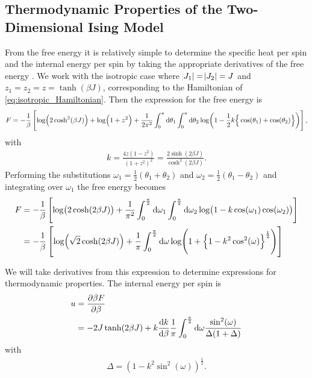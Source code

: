 \documentclass[11pt, a4paper]{report} %
\begin{document}
\subsection{Thermodynamic Properties of the Two-Dimensional Ising Model}
From the free energy it is relatively simple to determine the specific heat per spin and the internal energy per spin by taking the appropriate derivatives of the free energy \cite{mccoy:1973}. We work with the isotropic case where \(\abs{J_1} = \abs{J_2} = J\) and \(z_1 = z_2 = z = \tanh(\beta J)\), corresponding to the Hamiltonian of \cref{eq:isotropic_Hamiltonian}.
Then the expression for the free energy is
\begin{dmath}
	F = -\frac{1}{\beta} \left[\log(2\cosh^2(\beta J)) + \log(1+z^2) + \frac{1}{2\pi^2} \int_0^{\pi}\dif \theta_1 \int_0^{\pi} \dif \theta_2 \log(1-\frac{1}{2}k \Big\{\cos(\theta_1) + \cos(\theta_2)\Big\})\right],
\end{dmath}
with
\begin{align}
	\label{eq:elliptic_argument}
	k = \frac{4z(1-z^2)}{(1+z^2)^2} = \frac{2\sinh(2\beta J)}{\cosh^2{(2\beta J)}}.
\end{align}
Performing the substitutions \(\omega_1 = \frac{1}{2}(\theta_1 + \theta_2)\) and \(\omega_2 = \frac{1}{2}(\theta_1 - \theta_2)\) and integrating over \(\omega_1\) the free energy becomes
\begin{align}
		F &= -\frac{1}{\beta} \left[\log(2\cosh(2\beta J)) + \frac{1}{\pi^2} \int_0^{\frac{\pi}{2}} \dif \omega_1 \int_0^{\frac{\pi}{2}} \dif \omega_2 \log(1- k \cos(\omega_1)\cos(\omega_2))\right]\\
		&= -\frac{1}{\beta} \left[\log(\sqrt{2}\cosh(2\beta J)) + \frac{1}{\pi} \int_0^{\frac{\pi}{2}} \dif \omega \log(1+\left\{1-k^2 \cos^2(\omega)\right\}^{\frac{1}{2}}) \right]
\end{align}

We will take derivatives from this expression to determine expressions for thermodynamic properties. The internal energy per spin is
\begin{align}
	\label{eq:internal_energy}
	u &= \frac{\partial \beta F}{\partial \beta}\\
	&= -2 J \tanh(2\beta J) + k \frac{\dif k}{\dif \beta} \frac{1}{\pi} \int_0^{\frac{\pi}{2}} \dif \omega \frac{\sin^2(\omega)}{\Delta (1+\Delta)}
\end{align}
with
\begin{align}
	\Delta = \left( 1 - k^2 \sin^2(\omega) \right)^{\frac{1}{2}}.
\end{align}
\end{document}
